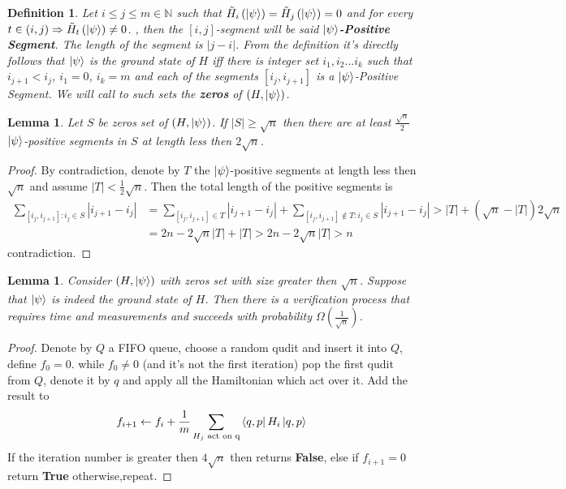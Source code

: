 \documentclass{article}
\newtheorem{lemma}[theorem]{Lemma}
\newtheorem{definition}[theorem]{Definition}
\begin{document}
\begin{definition} Let \(i \le j \le m \in \mathbb{N} \) such that \( \tilde{H}_{i}\left(\ket{\psi}\right) = \tilde{H}_{j}\left(\ket{\psi}\right) = 0 \) and for every \( t \in (i,j) \Rightarrow  \tilde{H}_{t}\left(\ket{\psi}\right) \neq 0 \). , then the \([i,j]\)-segment will be said  \(\ket{\psi}\)\textbf{-Positive Segment}. The length of the segment is \( |j-i|\). From the definition it's directly follows that \(\ket{\psi}\) is the ground state of \(H\) iff there is integer set \( i_1 , i_2 ... i_k \) such that \(i_{j+1} < i_{j}\), \(i_{1} = 0\), \(i_{k} = m\) and each of the segments \( [i_{j},i_{j+1}] \) is a \(\ket{\psi}\)-Positive Segment. We will call to such sets the \textbf{zeros} of \( \left( H, \ket{\psi} \right) \).
\end{definition}

\begin{lemma} Let \(S\) be zeros set of \(\left( H, \ket{\psi} \right) \). If \(|S| \ge \sqrt{n} \) then there are at least \( \frac{\sqrt{n}}{2} \) \(\ket{\psi}\)-positive segments in \(S\) at length less then \(2\sqrt{n}\). 
\end{lemma}

\begin{proof} By contradiction, denote by \( T \) the \( \ket{\psi}\)-positive segments at length less then \( \sqrt{n}\) and assume \( |T|  < \frac{1}{2}\sqrt{n} \). Then the total length of the positive segments is \begin{equation*}
\begin{split}
    \sum_{[i_{j},i_{j+1}]:i_{j}\in S}{|i_{j+1}-i_{j}|} &= \sum_{[i_{j},i_{j+1}]\in T}{|i_{j+1}-i_{j}|}+\sum_{[i_{j},i_{j+1}] \notin T :i_{j}\in S}{|i_{j+1}-i_{j}|} > |T| + \left(\sqrt{n}-|T|\right)2\sqrt{n} \\ 
    &= 2n - 2\sqrt{n}|T| + |T| > 2n - 2\sqrt{n}|T| > n 
\end{split}
\end{equation*} contradiction.
\end{proof}

\begin{lemma} Consider \( \left( H, \ket{\psi} \right) \) with zeros set with size greater then \(\sqrt{n}\). Suppose that \(\ket{\psi} \) is indeed the ground state of \(H\). Then there is a verification process that requires  time and measurements and succeeds with probability \( \Omega\left(\frac{1}{\sqrt{n}}\right)\).
\end{lemma}

\begin{proof}
Denote by \(Q\) a FIFO queue, choose a random qudit and insert it into \(Q\), define \(f_0 = 0 \). while \(f_0 \neq 0\) (and it's not the first iteration) pop the first qudit from \(Q\), denote it by \(q\) and apply all the Hamiltonian which act over it. Add the result to 
\begin{equation*}
     f_{i+1} \leftarrow f_{i} + \frac{1}{m}\sum_{H_{j} \text{ act on q} }{ \bra{q,p} H_i \ket{q,p} } 
\end{equation*} If the iteration number is greater then \(4\sqrt{n}\) then returns \textbf{False}, else if \(f_{i+1} =0 \) return \textbf{True} otherwise,repeat.       
\end{proof}
\end{document}
